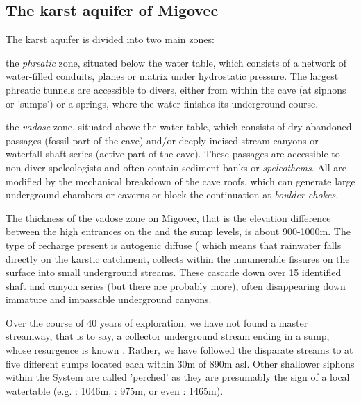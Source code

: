 \subsection{The karst aquifer of Migovec} 
The karst aquifer is divided into two main zones: \begin{citemize} 
\item the \emph{phreatic} zone, situated below the water table, which consists of a network of water-filled conduits, planes or matrix under hydrostatic pressure. The largest phreatic tunnels are accessible to divers, either from within the cave (at siphons or 'sumps') or a springs, where the water finishes its underground course. 
\item the \emph{vadose} zone, situated above the water table, which consists of dry abandoned passages (fossil part of the cave) and/or deeply incised stream canyons or waterfall shaft series (active part of the cave). These passages are accessible to non-diver speleologists and often contain sediment banks or \emph{speleothems}. All are modified by the mechanical breakdown of the cave roofs, which can generate large underground chambers or caverns or block the continuation at \emph{boulder chokes}. 
\end{citemize}

The thickness of the vadose zone on Migovec, that is the elevation difference between the high entrances on the  and the sump levels, is about 900-1000m. The type of recharge present is autogenic diffuse (\citep{ford2013karst} which means that rainwater falls directly on the karstic catchment, collects within the innumerable fissures on the surface into small underground streams. These cascade down over 15 identified shaft and canyon series (but there are probably more), often disappearing down immature and impassable underground canyons. 

Over the course of 40 years of exploration, we have not found a master streamway, that is to say, a collector underground stream ending in a sump, whose resurgence is known \citep{hm1}. Rather, we have followed the disparate streams to at five different sumps located each within 30m of 890m asl. Other shallower siphons within the System are called 'perched'  as they are presumably the sign of a local watertable (e.g. : 1046m, : 975m, or even : 1465m).

